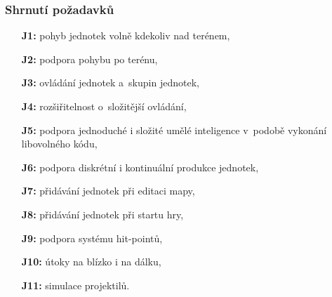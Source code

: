 \subsubsection{Shrnutí požadavků}
\begin{itemize}
	\item[\textbf{J1:}] pohyb jednotek volně kdekoliv nad terénem,
	\item[\textbf{J2:}] podpora pohybu po terénu,
	\item[\textbf{J3:}] ovládání jednotek a~skupin jednotek,
	\item[\textbf{J4:}] rozšiřitelnost o~složitější ovládání,
	\item[\textbf{J5:}] podpora jednoduché i složité umělé inteligence v~podobě vykonání libovolného kódu,
	\item[\textbf{J6:}] podpora diskrétní i kontinuální produkce jednotek,
	\item[\textbf{J7:}] přidávání jednotek při editaci mapy,
	\item[\textbf{J8:}] přidávání jednotek při startu hry,
	\item[\textbf{J9:}] podpora systému hit-pointů,
	\item[\textbf{J10:}] útoky na blízko i na dálku,
	\item[\textbf{J11:}] simulace projektilů.
\end{itemize}

\done
{}
